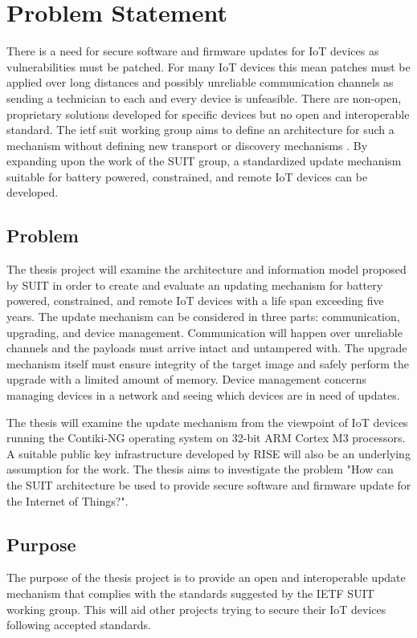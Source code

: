 \documentclass[0-thesis.tex]{subfiles}
\begin{document}
\section{Problem Statement}
There is a need for secure software and firmware updates for IoT devices as
vulnerabilities must be patched. For many IoT devices this mean patches must be applied
over long distances and possibly unreliable communication channels as sending a technician
to each and every device is unfeasible. There are non-open, proprietary solutions
developed for specific devices but no open and interoperable standard. The \gls{ietf}
\gls{suit} working group aims to define an architecture for such a mechanism without
defining new transport or discovery mechanisms \parencite{suit}. By expanding upon the
work of the SUIT group, a standardized update mechanism suitable for battery powered,
constrained, and remote IoT devices can be developed.

\subsection{Problem}
The thesis project will examine the architecture and information model proposed by SUIT in
order to create and evaluate an updating mechanism for battery powered, constrained, and
remote IoT devices with a life span exceeding five years. The update mechanism can be
considered in three parts: communication, upgrading, and device management. Communication
will happen over unreliable channels and the payloads must arrive intact and untampered
with. The upgrade mechanism itself must ensure integrity of the target image and safely
perform the upgrade with a limited amount of memory. Device management concerns managing
devices in a network and seeing which devices are in need of updates.

The thesis will examine the update mechanism from the viewpoint of IoT devices running the
Contiki-NG operating system on 32-bit ARM Cortex M3 processors. A suitable public key
infrastructure developed by RISE will also be an underlying assumption for the work. The
thesis aims to investigate the problem "How can the SUIT architecture be used to provide
secure software and firmware update for the Internet of Things?".

\subsection{Purpose}
The purpose of the thesis project is to provide an open and interoperable update mechanism
that complies with the standards suggested by the IETF SUIT working group. This will aid
other projects trying to secure their IoT devices following accepted standards.
\end{document}
